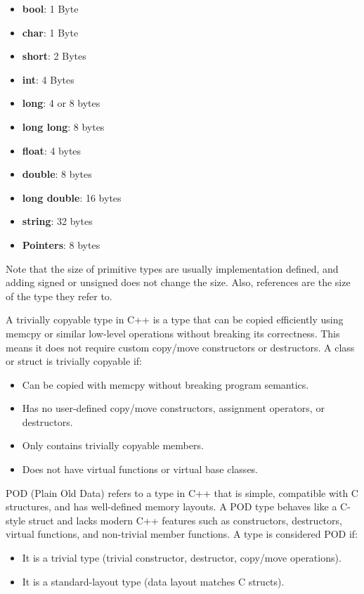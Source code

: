 \documentclass{report}
\begin{document}
    \pagebreak 
    \bigbreak \noindent 
    \begin{itemize}
        \item \textbf{bool}: 1 Byte
        \item \textbf{char}: 1 Byte
        \item \textbf{short}: 2 Bytes
        \item \textbf{int}: 4 Bytes
        \item \textbf{long}: 4 or 8 bytes
        \item \textbf{long long}: 8 bytes
        \item \textbf{float}: 4 bytes
        \item \textbf{double}: 8 bytes
        \item \textbf{long double}: 16 bytes
        \item \textbf{string}: 32 bytes
        \item \textbf{Pointers}: 8 bytes
    \end{itemize}
    \bigbreak \noindent 
    Note that the size of primitive types are usually implementation defined, and adding signed or unsigned does not change the size.
    \bigbreak \noindent 
    Also, references are the size of the type they refer to. 

    \pagebreak 
    \bigbreak \noindent 
    A trivially copyable type in C++ is a type that can be copied efficiently using memcpy or similar low-level operations without breaking its correctness. This means it does not require custom copy/move constructors or destructors.
    \bigbreak \noindent 
    A class or struct is trivially copyable if:
    \begin{itemize}
        \item Can be copied with memcpy without breaking program semantics.
        \item Has no user-defined copy/move constructors, assignment operators, or destructors.
        \item Only contains trivially copyable members.
        \item Does not have virtual functions or virtual base classes.
    \end{itemize}


    \pagebreak 
    \bigbreak \noindent 
    POD (Plain Old Data) refers to a type in C++ that is simple, compatible with C structures, and has well-defined memory layouts. A POD type behaves like a C-style struct and lacks modern C++ features such as constructors, destructors, virtual functions, and non-trivial member functions.
    \bigbreak \noindent 
    A type is considered POD if:
    \begin{itemize}
        \item It is a trivial type (trivial constructor, destructor, copy/move operations).
        \item It is a standard-layout type (data layout matches C structs).
    \end{itemize}
    \bigbreak \noindent 
\end{document}
